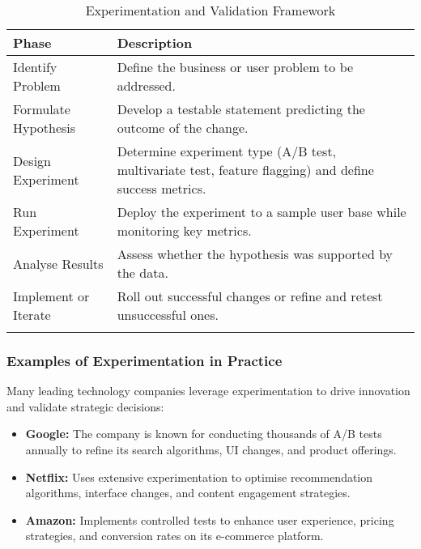 \begin{longtable}{|p{6cm}|p{6cm}|}
    \hline
    \textbf{Phase}       & \textbf{Description}                                                                                  \\
    \hline
    Identify Problem     & Define the business or user problem to be addressed.                                                  \\
    \hline
    Formulate Hypothesis & Develop a testable statement predicting the outcome of the change.                                    \\
    \hline
    Design Experiment    & Determine experiment type (A/B test, multivariate test, feature flagging) and define success metrics. \\
    \hline
    Run Experiment       & Deploy the experiment to a sample user base while monitoring key metrics.                             \\
    \hline
    Analyse Results      & Assess whether the hypothesis was supported by the data.                                              \\
    \hline
    Implement or Iterate & Roll out successful changes or refine and retest unsuccessful ones.                                   \\
    \hline
    \caption{Experimentation and Validation Framework}
\end{longtable}

\subsubsection{Examples of Experimentation in Practice}
Many leading technology companies leverage experimentation to drive innovation and validate strategic decisions:

\begin{itemize}
    \item \textbf{Google:} The company is known for conducting thousands of A/B tests annually to refine its search algorithms, UI changes, and product offerings.
    \item \textbf{Netflix:} Uses extensive experimentation to optimise recommendation algorithms, interface changes, and content engagement strategies.
    \item \textbf{Amazon:} Implements controlled tests to enhance user experience, pricing strategies, and conversion rates on its e-commerce platform.
\end{itemize}

